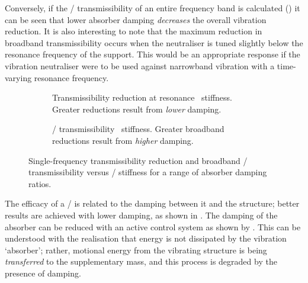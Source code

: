\documentclass[11pt,a4paper]{memoir}
\begin{document}
Conversely, if the \RMS/ transmissibility of an entire frequency band is calculated () it can be seen that lower absorber damping \emph{decreases} the overall vibration reduction.
It is also interesting to note that the maximum reduction in broadband transmissibility occurs when the neutraliser is tuned slightly below the resonance frequency of the support.
This would be an appropriate response if the vibration neutraliser were to be used against narrowband vibration with a time-varying resonance frequency.

\begin{figure}
\begin{wide}
  \begin{subfigure}[0.44]
    \caption{
      Transmissibility reduction at resonance \vs\ stiffness.
      Greater reductions result from \emph{lower} damping.}
  \end{subfigure}
  \qquad
  \begin{subfigure}[0.44]
    \caption{
      \expandafter\MakeUppercase\RMS/ transmissibility \vs\ stiffness.
      Greater broadband reductions result from \emph{higher} damping.}
  \end{subfigure}
\end{wide}
\caption[Single-frequency transmissibility reduction and broadband \RMS/ transmissibility versus \vibneut/ stiffness.]{
  Single-frequency transmissibility reduction and broadband \RMS/ transmissibility versus \vibneut/ stiffness for a range of absorber damping ratios.
}
\end{figure}

The efficacy of a \vibneut/ is related to the damping between it and the structure; better results are achieved with lower damping, as shown in .
The damping of the absorber can be reduced with an active control system as shown by \textcite{kidner1998}.
This can be understood with the realisation that energy is not dissipated by the vibration `absorber'; rather, motional energy from the vibrating structure is being \emph{transferred} to the supplementary mass, and this process is degraded by the presence of damping.
\end{document}

